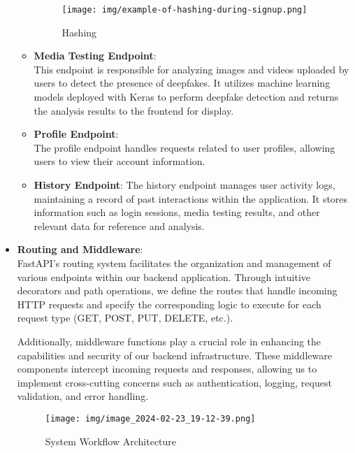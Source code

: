 \begin{itemize}
\begin{itemize}
                        \begin{figure}[htbp]
                              \centering
                              \texttt{[image: img/example-of-hashing-during-signup.png]}
                              \caption{Hashing}
                        \end{figure}
                  \item \textbf{Media Testing Endpoint}:\\
                        This endpoint is responsible for analyzing images and videos uploaded by users to detect the presence of deepfakes. It utilizes machine learning models deployed with Keras to perform deepfake detection and returns the analysis results to the frontend for display.

                  \item \textbf{Profile Endpoint}:\\
                        The profile endpoint handles requests related to user profiles, allowing users to view their account information.

                  \item \textbf{History Endpoint}: The history endpoint manages user activity logs, maintaining a record of past interactions within the application. It stores information such as login sessions, media testing results, and other relevant data for reference and analysis.
            \end{itemize}

      \item \textbf{Routing and Middleware}:\\
            FastAPI's routing system facilitates the organization and management of various endpoints within our backend application. Through intuitive decorators and path operations, we define the routes that handle incoming HTTP requests and specify the corresponding logic to execute for each request type (GET, POST, PUT, DELETE, etc.).

            Additionally, middleware functions play a crucial role in enhancing the capabilities and security of our backend infrastructure. These middleware components intercept incoming requests and responses, allowing us to implement cross-cutting concerns such as authentication, logging, request validation, and error handling.

            \begin{figure}[htbp]
                  \centering
                  \texttt{[image: img/image\_2024-02-23\_19-12-39.png]}
                  \caption{System Workflow Architecture}
            \end{figure}


\end{itemize}
